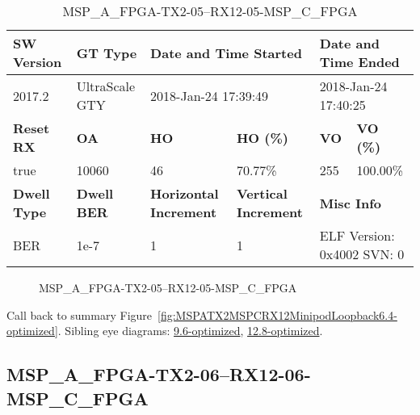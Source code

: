 \begin{table}[h]
\centering
\caption{MSP\_A\_FPGA-TX2-05--RX12-05-MSP\_C\_FPGA}
\label{tab:MSPAFPGATX205RX1205MSPCFPGA6.4-optimized}
\begin{tabular}{@{}|l|l|l|l|l|l|@{}}
\toprule
\textbf{SW Version}                & \textbf{GT Type}   & \multicolumn{2}{l|}{\textbf{Date and Time Started}}            & \multicolumn{2}{l|}{\textbf{Date and Time Ended}}        \\ \midrule
2017.2                       & UltraScale GTY          & \multicolumn{2}{l|}{2018-Jan-24 17:39:49}                   & \multicolumn{2}{l|}{2018-Jan-24 17:40:25}               \\ \midrule
\textbf{Reset RX}                  & \textbf{OA} & \textbf{HO}   & \textbf{HO (\%)} & \textbf{VO} & \textbf{VO (\%)} \\ \midrule
true & 10060        & 46          & 70.77\%        & 255        & 100.00\%       \\ \midrule
\textbf{Dwell Type}                & \textbf{Dwell BER} & \textbf{Horizontal Increment} & \textbf{Vertical Increment}    & \multicolumn{2}{l|}{\textbf{Misc Info}}                  \\ \midrule
BER                            & 1e-7        & 1        & 1           & \multicolumn{2}{l|}{ELF Version: 0x4002 SVN: 0}                         \\ \bottomrule
\end{tabular}
\end{table}

\begin{figure}[h]
\caption{MSP\_A\_FPGA-TX2-05--RX12-05-MSP\_C\_FPGA} \label{fig:MSPAFPGATX205RX1205MSPCFPGA6.4-optimized}
\end{figure}

Call back to summary Figure~\ref{fig:MSPATX2MSPCRX12MinipodLoopback6.4-optimized}.
Sibling eye diagrams: \hyperref[sec:MSPAFPGATX205RX1205MSPCFPGA9.6-optimized]{9.6-optimized}, \hyperref[sec:MSPAFPGATX205RX1205MSPCFPGA12.8-optimized]{12.8-optimized}.

\clearpage
\newpage


\subsection{MSP\_A\_FPGA-TX2-06--RX12-06-MSP\_C\_FPGA}\label{sec:MSPAFPGATX206RX1206MSPCFPGA6.4-optimized}

